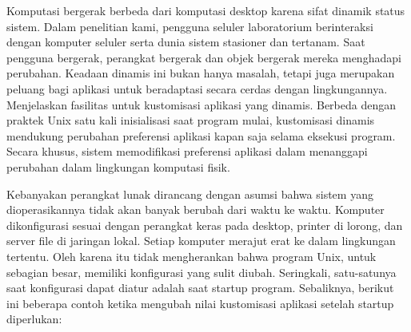 Komputasi bergerak berbeda dari komputasi desktop karena sifat dinamik status sistem. Dalam penelitian kami, pengguna seluler laboratorium berinteraksi dengan komputer seluler serta dunia sistem stasioner dan tertanam. Saat pengguna bergerak, perangkat bergerak dan objek bergerak mereka menghadapi perubahan. Keadaan dinamis ini bukan hanya masalah, tetapi juga merupakan peluang bagi aplikasi untuk beradaptasi secara cerdas dengan lingkungannya.
Menjelaskan fasilitas untuk kustomisasi aplikasi yang dinamis. Berbeda dengan praktek Unix satu kali inisialisasi saat program mulai, kustomisasi dinamis mendukung perubahan preferensi aplikasi kapan saja selama eksekusi program. Secara khusus, sistem memodifikasi preferensi aplikasi dalam menanggapi perubahan dalam lingkungan komputasi fisik.

Kebanyakan perangkat lunak dirancang dengan asumsi bahwa sistem yang dioperasikannya tidak akan banyak berubah dari waktu ke waktu. Komputer dikonfigurasi sesuai dengan perangkat keras pada desktop, printer di lorong, dan server file di jaringan lokal. Setiap komputer merajut erat ke dalam lingkungan tertentu. Oleh karena itu tidak mengherankan bahwa program Unix, untuk sebagian besar, memiliki konfigurasi yang sulit diubah. Seringkali, satu-satunya saat konfigurasi dapat diatur adalah saat startup program.
Sebaliknya, berikut ini beberapa contoh ketika mengubah nilai kustomisasi aplikasi setelah startup diperlukan:
